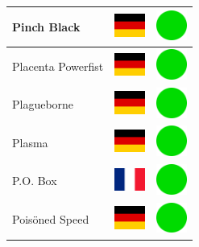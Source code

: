 \documentclass[12pt, a4paper, twoside]{report}
\begin{document}
\begin{center}
\begin{longtable}{|p{5cm}|p{2cm}|p{2cm}|}
 Pinch Black                                                & \includegraphics[width=1cm]{4x3/de} &   \includegraphics[width=1cm]{likes/y} \\ \hline
 Placenta Powerfist                                         & \includegraphics[width=1cm]{4x3/de} &   \includegraphics[width=1cm]{likes/y} \\ \hline
 Plagueborne                                                & \includegraphics[width=1cm]{4x3/de} &   \includegraphics[width=1cm]{likes/y} \\ \hline
 Plasma                                                     & \includegraphics[width=1cm]{4x3/de} &   \includegraphics[width=1cm]{likes/y} \\ \hline
 P.O. Box                                                   & \includegraphics[width=1cm]{4x3/fr} &   \includegraphics[width=1cm]{likes/y} \\ \hline
 Poisöned Speed                                             & \includegraphics[width=1cm]{4x3/de} &   \includegraphics[width=1cm]{likes/y} \\ \hline

\end{longtable}
\end{center}
\end{document}
